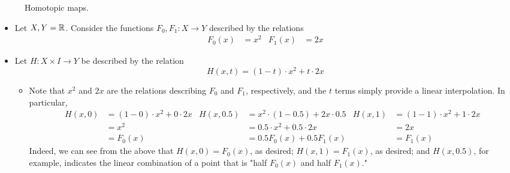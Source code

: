\documentclass[../notes.tex]{subfiles}
\begin{document}
\begin{itemize}
\begin{figure}[h!]
        \caption{Homotopic maps.}
        \label{fig:homotopy}
    \end{figure}
    \begin{itemize}
        \item Let $X,Y=\mathbb{R}$. Consider the functions $F_0,F_1:X\to Y$ described by the relations
        \begin{align*}
            F_0(x) &= x^2&
            F_1(x) &= 2x
        \end{align*}
        \item Let $H:X\times I\to Y$ be described by the relation
        \begin{equation*}
            H(x,t) = (1-t)\cdot x^2+t\cdot 2x
        \end{equation*}
        \begin{itemize}
            \item Note that $x^2$ and $2x$ are the relations describing $F_0$ and $F_1$, respectively, and the $t$ terms simply provide a linear interpolation. In particular,
            \begin{align*}
                H(x,0) &= (1-0)\cdot x^2+0\cdot 2x&
                    H(x,0.5) &= x^2\cdot(1-0.5)+2x\cdot 0.5&
                        H(x,1) &= (1-1)\cdot x^2+1\cdot 2x\\
                &= x^2&
                    &= 0.5\cdot x^2+0.5\cdot 2x&
                        &= 2x\\
                &= F_0(x)&
                    &= 0.5F_0(x)+0.5F_1(x)&
                        &= F_1(x)
            \end{align*}
            Indeed, we can see from the above that $H(x,0)=F_0(x)$, as desired; $H(x,1)=F_1(x)$, as desired; and $H(x,0.5)$, for example, indicates the linear combination of a point that is "half $F_0(x)$ and half $F_1(x)$."

\end{itemize}
\end{itemize}
\end{itemize}
\end{document}
